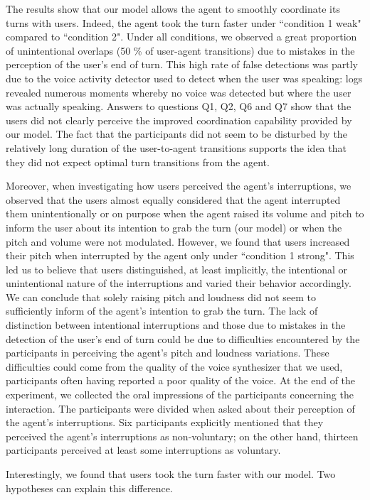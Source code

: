 \documentclass[twocolumn]{svjour3}
\begin{document}
The results show that our model allows the agent to smoothly coordinate its turns with users. Indeed, the agent took the turn faster under ``condition 1 weak" compared to ``condition 2". Under all conditions, we observed a great proportion of unintentional overlaps (50 \% of user-agent transitions) due to mistakes in the perception of the user's end of turn. This high rate of false detections was partly due to the voice activity detector used to detect when the user was speaking: logs revealed numerous moments whereby no voice was detected but where the user was actually speaking. 
Answers to questions Q1, Q2, Q6 and Q7 show that the users did not clearly perceive the improved coordination capability provided by our model. The fact that the participants did not seem to be disturbed by the relatively long duration of the user-to-agent transitions supports the idea that they did not expect optimal turn transitions from the agent.

Moreover, when investigating how users perceived the agent's interruptions, we observed that the users almost equally considered  that the agent interrupted them unintentionally or on purpose when the agent raised its volume and pitch to inform the user about its intention to grab the turn (our model) or when the pitch and volume were not modulated. However, we found that users increased their pitch when interrupted by the agent only under ``condition 1 strong". This led us to believe that users distinguished, at least implicitly, the intentional or unintentional nature of the interruptions and varied their behavior accordingly. We can conclude that solely raising pitch and loudness did not seem to sufficiently inform of the agent's intention to grab the turn. The lack of distinction between intentional interruptions and those due to mistakes in the detection of the user's end of turn could be due to difficulties encountered by the participants in perceiving the agent's pitch and loudness variations. These difficulties could come from the quality of the voice synthesizer that we used, participants often having reported a poor quality of the voice. 
At the end of the experiment, we collected the oral impressions of the participants concerning the interaction. The participants were divided when asked about their perception of the agent's interruptions. Six participants explicitly mentioned that they perceived the agent's interruptions as non-voluntary; on the other hand, thirteen participants perceived at least some interruptions as voluntary. 

 Interestingly, we found that users took the turn faster with our model. Two hypotheses can explain this difference. 
\end{document}
